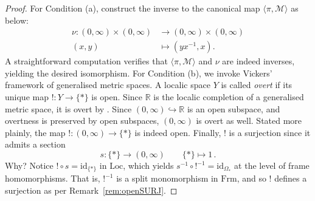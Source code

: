 \documentclass[a4paper, 11pt,reqno]{amsart}
\newcommand{\R}{\mathbb{R}}
\newcommand{\id}{\mathrm{id}}
\newcommand{\Loc}{\mathrm{Loc}}
\newcommand{\Frm}{\mathrm{Frm}}
\newcommand{\M}{\mathcal{M}}
\newcommand{\lranglet}[2]{\langle#1,#2\rangle}
\begin{document}
\begin{proof}
For Condition (a), construct the inverse to the canonical map $\lranglet{\pi}{\M}$ as below:
	\begin{align*}\label{eq:Step2DiagramINVERSE}
\nu\colon (0,\infty)\times (0,\infty) &\longrightarrow (0,\infty)\times (0,\infty)\\
	(x,y)&\longmapsto(yx^{-1},x).
	\end{align*}
A straightforward computation verifies that $\langle \pi,\M\rangle$ and $\nu$ are indeed inverses, yielding the desired isomorphism.
For Condition (b), we invoke Vickers' framework of generalised metric spaces. A localic space $Y$ is called {\em overt} if its unique map $!\colon Y\to \{\ast\}$ is open. Since $\R$ is the localic completion of a generalised metric space, it is overt by \cite[Corollary 6.9]{ViLocCompII}. Since $(0,\infty)\hookrightarrow\mathbb R$ is an open subspace, and overtness is preserved by open subspaces, $(0,\infty)$ is overt as well. Stated more plainly, the map $!\colon (0,\infty)\to\{*\}$ is indeed open. Finally, $!$ is a surjection since it admits a section
$$s\colon \{\ast\}\to (0,\infty)\qquad \{\ast\}\longmapsto 1\,.$$
Why? Notice $!\circ s=\id_{\{\ast\}}$ in $\Loc$, which yields
$s^{-1}\circ !^{-1}=\id_{\Omega_{\ast}}$ at the level of frame homomorphisms. That is, $!^{-1}$ is a split monomorphism in $\Frm$, and so $!$ defines a surjection as per Remark~\ref{rem:openSURJ}. 

\end{proof}
\end{document}
